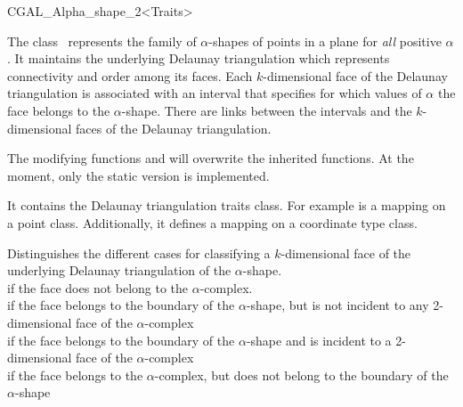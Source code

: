 \begin{ccClassTemplate} {CGAL_Alpha_shape_2<Traits>}

\ccDefinition
The class \ccClassTemplateName\ represents the family of
$\alpha$-shapes of points in a plane for {\em all} positive
$\alpha$. It maintains the underlying Delaunay triangulation which
represents connectivity and order among its faces. Each
$k$-dimensional face of the Delaunay triangulation is associated with
an interval that specifies for which values of $\alpha$ the face
belongs to the $\alpha$-shape. There are links between the intervals
and the $k$-dimensional faces of the Delaunay triangulation.



\ccInheritsFrom


The modifying functions  and  will overwrite
the inherited functions. At the moment, only the static version is implemented.

\ccTypes
{}
\ccThreeToTwo

 
It contains the Delaunay triangulation traits class.  For example
 is a mapping on a point class. Additionally,
it defines a mapping on a coordinate type class.



{Distinguishes the different cases for classifying a $k$-dimensional face
 of the underlying Delaunay triangulation of the $\alpha$-shape. \\
 if the face does not belong to the $\alpha$-complex.\\
 if the face belongs to the boundary of the $\alpha$-shape,
 but is not incident to any 2-dimensional face of the $\alpha$-complex\\
 if the face belongs to the boundary of the $\alpha$-shape
 and is incident to a 2-dimensional face of the $\alpha$-complex\\
 if the face belongs to the $\alpha$-complex, but does
not belong to the boundary of the $\alpha$-shape\\}


\end{ccClassTemplate}
